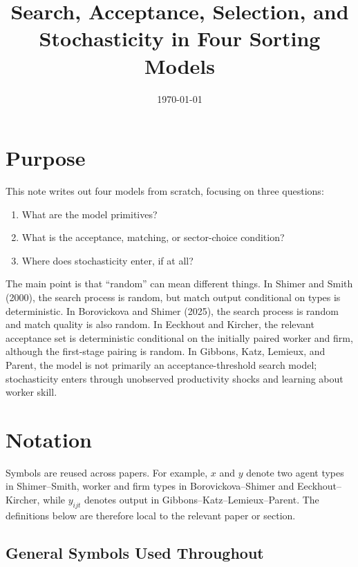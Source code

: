 \documentclass[11pt]{article}
\title{Search, Acceptance, Selection, and Stochasticity in Four Sorting Models}
\author{}
\date{\today}
\newcommand{\1}{\mathbf{1}}
\begin{document}
\maketitle

\section{Purpose}

This note writes out four models from scratch, focusing on three questions:
\begin{enumerate}[label=(\roman*)]
    \item What are the model primitives?
    \item What is the acceptance, matching, or sector-choice condition?
    \item Where does stochasticity enter, if at all?
\end{enumerate}

The main point is that ``random'' can mean different things. In Shimer and Smith (2000), the search process is random, but match output conditional on types is deterministic. In Borovickova and Shimer (2025), the search process is random and match quality is also random. In Eeckhout and Kircher, the relevant acceptance set is deterministic conditional on the initially paired worker and firm, although the first-stage pairing is random. In Gibbons, Katz, Lemieux, and Parent, the model is not primarily an acceptance-threshold search model; stochasticity enters through unobserved productivity shocks and learning about worker skill.

\section{Notation}

Symbols are reused across papers. For example, $x$ and $y$ denote two agent types in Shimer--Smith, worker and firm types in Borovickova--Shimer and Eeckhout--Kircher, while $y_{ijt}$ denotes output in Gibbons--Katz--Lemieux--Parent. The definitions below are therefore local to the relevant paper or section.

\subsection*{General Symbols Used Throughout}
\end{document}
